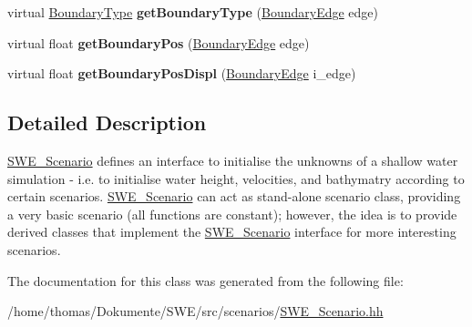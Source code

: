 \begin{DoxyCompactItemize}
\item 
\hypertarget{classSWE__Scenario_ab8fe7ce15d7758fb0c4e0e3887b34a5d}{virtual \hyperlink{SWE__Scenario_8hh_af75d5dd7322fa39ed0af4e7839e600f8}{Boundary\-Type} {\bfseries get\-Boundary\-Type} (\hyperlink{SWE__Scenario_8hh_aa5e01e3f7df312f7b9b0d02521141fcc}{Boundary\-Edge} edge)}\label{classSWE__Scenario_ab8fe7ce15d7758fb0c4e0e3887b34a5d}

\item 
\hypertarget{classSWE__Scenario_a1b01e953c2079b64f527c9bc5a0c86d7}{virtual float {\bfseries get\-Boundary\-Pos} (\hyperlink{SWE__Scenario_8hh_aa5e01e3f7df312f7b9b0d02521141fcc}{Boundary\-Edge} edge)}\label{classSWE__Scenario_a1b01e953c2079b64f527c9bc5a0c86d7}

\item 
\hypertarget{classSWE__Scenario_a0759f0e98d6eba277b0f385ef79c3b79}{virtual float {\bfseries get\-Boundary\-Pos\-Displ} (\hyperlink{SWE__Scenario_8hh_aa5e01e3f7df312f7b9b0d02521141fcc}{Boundary\-Edge} i\-\_\-edge)}\label{classSWE__Scenario_a0759f0e98d6eba277b0f385ef79c3b79}

\end{DoxyCompactItemize}


\subsection{Detailed Description}
\hyperlink{classSWE__Scenario}{S\-W\-E\-\_\-\-Scenario} defines an interface to initialise the unknowns of a shallow water simulation -\/ i.\-e. to initialise water height, velocities, and bathymatry according to certain scenarios. \hyperlink{classSWE__Scenario}{S\-W\-E\-\_\-\-Scenario} can act as stand-\/alone scenario class, providing a very basic scenario (all functions are constant); however, the idea is to provide derived classes that implement the \hyperlink{classSWE__Scenario}{S\-W\-E\-\_\-\-Scenario} interface for more interesting scenarios. 

The documentation for this class was generated from the following file\-:\begin{DoxyCompactItemize}
\item 
/home/thomas/\-Dokumente/\-S\-W\-E/src/scenarios/\hyperlink{SWE__Scenario_8hh}{S\-W\-E\-\_\-\-Scenario.\-hh}\end{DoxyCompactItemize}
